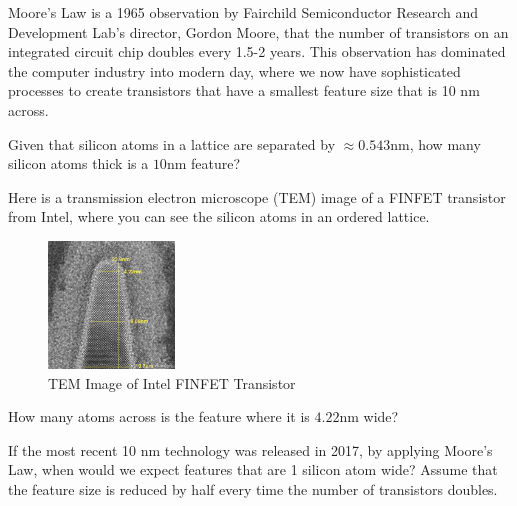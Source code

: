 
Moore's Law is a 1965 observation by Fairchild Semiconductor Research and Development Lab's director, Gordon Moore, that the number of transistors on an integrated circuit chip doubles every 1.5-2 years. This observation has dominated the computer industry into modern day, where we now have sophisticated processes to create transistors that have a smallest feature size that is 10 \si{\nano\meter} across.

\begin{enumerate}
	\qitem Given that silicon atoms in a lattice are separated by $\approx 0.543 \si{\nano\meter}$, how many silicon atoms thick is a $10 \si{\nano\meter}$ feature?
	

	\qitem Here is a transmission electron microscope (TEM) image of a FINFET transistor from Intel, where you can see the silicon atoms in an ordered lattice.
	
	\begin{figure}[H]{
			\centering
			\includegraphics[width=0.3\textwidth]{q_moores_law/tem_silicon_image.png}
			\caption{TEM Image of Intel FINFET Transistor}
			\vspace{-5mm}}
		\label{fig:TEM}
	\end{figure}
\end{enumerate}

	How many atoms across is the feature where it is $4.22 \si{\nano\meter}$ wide?
	
	\qitem If the most recent 10 \si{\nano\meter} technology was released in 2017, by applying Moore's Law, when would we expect features that are 1 silicon atom wide? Assume that the feature size is reduced by half every time the number of transistors doubles.
	
